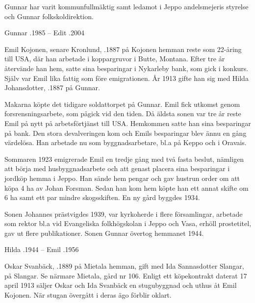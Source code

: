 Gunnar har varit kommunfullmäktig samt ledamot i Jeppo andelsmejeris styrelse och Gunnar folkskoldirektion.

Gunnar .1985  --  Edit .2004






Emil Kojonen, senare Kronlund, .1887 på Kojonen hemman reste som 22-åring till USA, där han arbetade i koppargruvor i Butte, Montana. Efter tre år återvände han hem, satte sina besparingar i Nykarleby bank, som gick i konkurs. Själv var Emil lika fattig som före emigrationen. År 1913 gifte han sig med Hilda Johansdotter, .1887 på Gunnar.

\begin{jhchildren}
  \item {}
  \item {}
\end{jhchildren}

Makarna köpte det tidigare soldattorpet på Gunnar. Emil fick utkomst genom forsrensningsarbete, som pågick vid den tiden. Då äldsta sonen var tre år reste Emil på nytt på arbetsförtjänst till USA. Hemkommen satte han sina besparingar på bank. Den stora devalveringen kom och Emils besparingar blev ännu en gång värdelösa. Han arbetade nu som byggnadsarbetare, bl.a på Keppo och i Oravais.

Sommaren 1923 emigrerade Emil en tredje gång med två fasta beslut, nämligen att börja med husbyggnadsarbete och att genast placera sina besparingar i jordköp hemma i Jeppo. Han sände hem pengar och gav hustrun order om att köpa 4 ha av Johan Forsman. Sedan han kom hem köpte han ett annat skifte om 6 ha samt ett par mindre skogsskiften. En ny gård byggdes 1934.

Sonen Johannes prästvigdes 1939, var kyrkoherde i flere församlingar, arbetade som rektor bl.a vid  Evangeliska folkhögskolan i Jeppo och Vasa, erhöll prostetitel, gav ut flere publikationer. Sonen Gunnar övertog hemmanet 1944.

Hilda .1944  --  Emil .1956


Oskar Svanbäck, .1889 på Mietala hemman, gift med Ida Sannasdotter Slangar,  på Slangar. Se närmare Mietala, gård nr 106. Enligt ett köpekontrakt daterat 17 april 1913 säljer Oskar och Ida Svanbäck en stugubyggnad och uthus åt Emil Kojonen. När stugan övergått i deras ägo förblir oklart.


